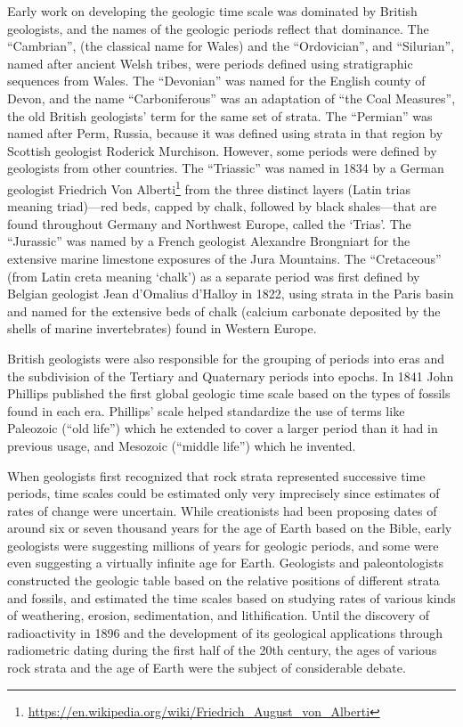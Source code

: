 \documentclass[]{book}
\let\rmarkdownfootnote\footnote%
\def\footnote{\protect\rmarkdownfootnote}
\renewcommand{\href}[2]{#2\footnote{\url{#1}}}
\begin{document}
Early work on developing the geologic time scale was dominated by British geologists, and the names of the geologic periods reflect that dominance. The ``Cambrian'', (the classical name for Wales) and the ``Ordovician'', and ``Silurian'', named after ancient Welsh tribes, were periods defined using stratigraphic sequences from Wales. The ``Devonian'' was named for the English county of Devon, and the name ``Carboniferous'' was an adaptation of ``the Coal Measures'', the old British geologists' term for the same set of strata. The ``Permian'' was named after Perm, Russia, because it was defined using strata in that region by Scottish geologist Roderick Murchison. However, some periods were defined by geologists from other countries. The ``Triassic'' was named in 1834 by a German geologist \href{https://en.wikipedia.org/wiki/Friedrich_August_von_Alberti}{Friedrich Von Alberti} from the three distinct layers (Latin trias meaning triad)---red beds, capped by chalk, followed by black shales---that are found throughout Germany and Northwest Europe, called the `Trias'. The ``Jurassic'' was named by a French geologist Alexandre Brongniart for the extensive marine limestone exposures of the Jura Mountains. The ``Cretaceous'' (from Latin creta meaning `chalk') as a separate period was first defined by Belgian geologist Jean d'Omalius d'Halloy in 1822, using strata in the Paris basin and named for the extensive beds of chalk (calcium carbonate deposited by the shells of marine invertebrates) found in Western Europe.

British geologists were also responsible for the grouping of periods into eras and the subdivision of the Tertiary and Quaternary periods into epochs. In 1841 John Phillips published the first global geologic time scale based on the types of fossils found in each era. Phillips' scale helped standardize the use of terms like Paleozoic (``old life'') which he extended to cover a larger period than it had in previous usage, and Mesozoic (``middle life'') which he invented.

When geologists first recognized that rock strata represented successive time periods, time scales could be estimated only very imprecisely since estimates of rates of change were uncertain. While creationists had been proposing dates of around six or seven thousand years for the age of Earth based on the Bible, early geologists were suggesting millions of years for geologic periods, and some were even suggesting a virtually infinite age for Earth. Geologists and paleontologists constructed the geologic table based on the relative positions of different strata and fossils, and estimated the time scales based on studying rates of various kinds of weathering, erosion, sedimentation, and lithification. Until the discovery of radioactivity in 1896 and the development of its geological applications through radiometric dating during the first half of the 20th century, the ages of various rock strata and the age of Earth were the subject of considerable debate.
\end{document}
